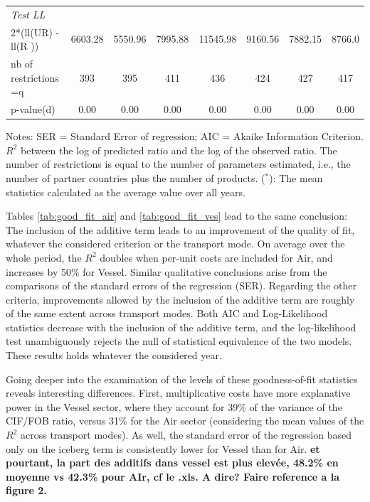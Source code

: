 \documentclass[a4paper,11pt]{article}
\begin{document}
\begin{table}[htbp]
{\begin{center}
\begin{tabular}{l|cccccc|c}
    \multicolumn{8}{l}{\textit{Test LL }}  \\
    2*(ll(UR) -ll(R )) & \multicolumn{1}{c}{6603.28} & \multicolumn{1}{c}{5550.96} & \multicolumn{1}{c}{7995.88} & \multicolumn{1}{c}{11545.98} & 9160.56 & \multicolumn{1}{c}{7882.15} & 8766.0 \\
    nb of restrictions =q  & \multicolumn{1}{c}{393} & \multicolumn{1}{c}{395} & \multicolumn{1}{c}{411} & \multicolumn{1}{c}{436} & 424   & \multicolumn{1}{c}{427} & 417 \\
    p-value(d) & \multicolumn{1}{c}{0.00} & \multicolumn{1}{c}{0.00} & \multicolumn{1}{c}{0.00} & \multicolumn{1}{c}{0.00} & 0.00  & \multicolumn{1}{c}{0.00} & 0.00 \\
    \hline \hline
    \end{tabular}%
    \end{center}}
  \label{tab:good_fit_vessel}%
  \parbox[l]{8cm}{\tiny{Notes: SER = Standard Error of regression; AIC = Akaike Information Criterion. $R^{2}$ between the log of predicted ratio and the log of the observed ratio. The number of restrictions is equal to the number of parameters estimated, i.e., the number of partner countries plus the number of products. ($^\ast$): The mean statistics calculated as the average value over all years. }}
\end{table}%


Tables \ref{tab:good_fit_air} and \ref{tab:good_fit_ves} lead to the same conclusion: The inclusion of the additive term leads to an improvement of the quality of fit, whatever the considered criterion or the transport mode. On average over the whole period, the $R^{2}$ doubles when per-unit costs are included for Air, and increases by 50\% for Vessel. Similar qualitative conclusions arise from the comparisons of the standard errors of the regression (SER). Regarding the other criteria, improvements allowed by the inclusion of the additive term are roughly of the same extent across transport modes. Both AIC and Log-Likelihood statistics decrease with the inclusion of the additive term, and the log-likelihood test unambiguously rejects the null of statistical equivalence of the two models. These results holds whatever the considered year.\smallskip

Going deeper into the examination of the levels of these goodness-of-fit statistics reveals interesting differences. First, multiplicative costs have more explanative power in the Vessel sector, where they account for 39\% of the variance of the CIF/FOB ratio, versus 31\% for the Air sector (considering the mean values of the $R^2$ across transport modes). As well, the standard error of the regression based only on the iceberg term is consistently lower for Vessel than for Air. \textbf{et pourtant, la part des additifs dans vessel est plus elevée, 48.2\% en moyenne vs 42.3\% pour AIr, cf le .xls. A dire? Faire reference a la figure 2.}
\end{document}
